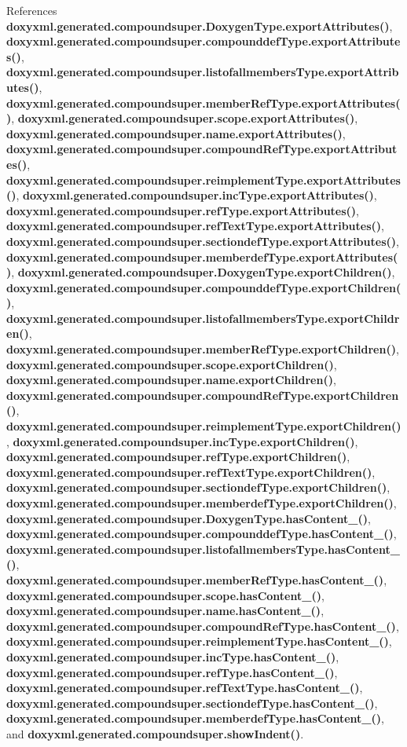 References {\bf doxyxml.\+generated.\+compoundsuper.\+Doxygen\+Type.\+export\+Attributes()}, {\bf doxyxml.\+generated.\+compoundsuper.\+compounddef\+Type.\+export\+Attributes()}, {\bf doxyxml.\+generated.\+compoundsuper.\+listofallmembers\+Type.\+export\+Attributes()}, {\bf doxyxml.\+generated.\+compoundsuper.\+member\+Ref\+Type.\+export\+Attributes()}, {\bf doxyxml.\+generated.\+compoundsuper.\+scope.\+export\+Attributes()}, {\bf doxyxml.\+generated.\+compoundsuper.\+name.\+export\+Attributes()}, {\bf doxyxml.\+generated.\+compoundsuper.\+compound\+Ref\+Type.\+export\+Attributes()}, {\bf doxyxml.\+generated.\+compoundsuper.\+reimplement\+Type.\+export\+Attributes()}, {\bf doxyxml.\+generated.\+compoundsuper.\+inc\+Type.\+export\+Attributes()}, {\bf doxyxml.\+generated.\+compoundsuper.\+ref\+Type.\+export\+Attributes()}, {\bf doxyxml.\+generated.\+compoundsuper.\+ref\+Text\+Type.\+export\+Attributes()}, {\bf doxyxml.\+generated.\+compoundsuper.\+sectiondef\+Type.\+export\+Attributes()}, {\bf doxyxml.\+generated.\+compoundsuper.\+memberdef\+Type.\+export\+Attributes()}, {\bf doxyxml.\+generated.\+compoundsuper.\+Doxygen\+Type.\+export\+Children()}, {\bf doxyxml.\+generated.\+compoundsuper.\+compounddef\+Type.\+export\+Children()}, {\bf doxyxml.\+generated.\+compoundsuper.\+listofallmembers\+Type.\+export\+Children()}, {\bf doxyxml.\+generated.\+compoundsuper.\+member\+Ref\+Type.\+export\+Children()}, {\bf doxyxml.\+generated.\+compoundsuper.\+scope.\+export\+Children()}, {\bf doxyxml.\+generated.\+compoundsuper.\+name.\+export\+Children()}, {\bf doxyxml.\+generated.\+compoundsuper.\+compound\+Ref\+Type.\+export\+Children()}, {\bf doxyxml.\+generated.\+compoundsuper.\+reimplement\+Type.\+export\+Children()}, {\bf doxyxml.\+generated.\+compoundsuper.\+inc\+Type.\+export\+Children()}, {\bf doxyxml.\+generated.\+compoundsuper.\+ref\+Type.\+export\+Children()}, {\bf doxyxml.\+generated.\+compoundsuper.\+ref\+Text\+Type.\+export\+Children()}, {\bf doxyxml.\+generated.\+compoundsuper.\+sectiondef\+Type.\+export\+Children()}, {\bf doxyxml.\+generated.\+compoundsuper.\+memberdef\+Type.\+export\+Children()}, {\bf doxyxml.\+generated.\+compoundsuper.\+Doxygen\+Type.\+has\+Content\+\_\+()}, {\bf doxyxml.\+generated.\+compoundsuper.\+compounddef\+Type.\+has\+Content\+\_\+()}, {\bf doxyxml.\+generated.\+compoundsuper.\+listofallmembers\+Type.\+has\+Content\+\_\+()}, {\bf doxyxml.\+generated.\+compoundsuper.\+member\+Ref\+Type.\+has\+Content\+\_\+()}, {\bf doxyxml.\+generated.\+compoundsuper.\+scope.\+has\+Content\+\_\+()}, {\bf doxyxml.\+generated.\+compoundsuper.\+name.\+has\+Content\+\_\+()}, {\bf doxyxml.\+generated.\+compoundsuper.\+compound\+Ref\+Type.\+has\+Content\+\_\+()}, {\bf doxyxml.\+generated.\+compoundsuper.\+reimplement\+Type.\+has\+Content\+\_\+()}, {\bf doxyxml.\+generated.\+compoundsuper.\+inc\+Type.\+has\+Content\+\_\+()}, {\bf doxyxml.\+generated.\+compoundsuper.\+ref\+Type.\+has\+Content\+\_\+()}, {\bf doxyxml.\+generated.\+compoundsuper.\+ref\+Text\+Type.\+has\+Content\+\_\+()}, {\bf doxyxml.\+generated.\+compoundsuper.\+sectiondef\+Type.\+has\+Content\+\_\+()}, {\bf doxyxml.\+generated.\+compoundsuper.\+memberdef\+Type.\+has\+Content\+\_\+()}, and {\bf doxyxml.\+generated.\+compoundsuper.\+show\+Indent()}.



